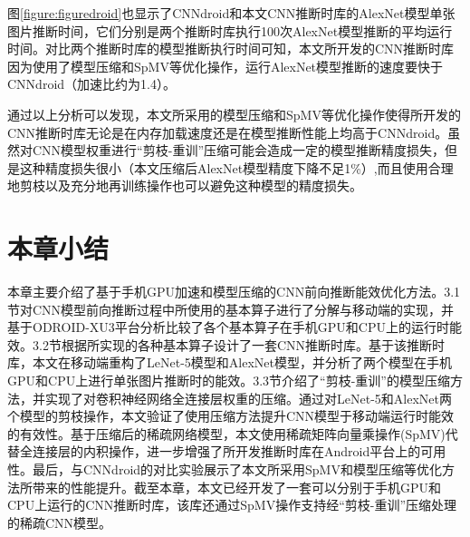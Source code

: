 图\ref{figure:figuredroid}也显示了CNNdroid和本文CNN推断时库的AlexNet模型单张图片推断时间，它们分别是两个推断时库执行100次AlexNet模型推断的平均运行时间。对比两个推断时库的模型推断执行时间可知，本文所开发的CNN推断时库因为使用了模型压缩和SpMV等优化操作，运行AlexNet模型推断的速度要快于CNNdroid（加速比约为1.4）。

通过以上分析可以发现，本文所采用的模型压缩和SpMV等优化操作使得所开发的CNN推断时库无论是在内存加载速度还是在模型推断性能上均高于CNNdroid。虽然对CNN模型权重进行“剪枝-重训”压缩可能会造成一定的模型推断精度损失，但是这种精度损失很小（本文压缩后AlexNet模型精度下降不足1\%）,而且使用合理地剪枝以及充分地再训练操作也可以避免这种模型的精度损失。



\section{本章小结}

本章主要介绍了基于手机GPU加速和模型压缩的CNN前向推断能效优化方法。3.1节对CNN模型前向推断过程中所使用的基本算子进行了分解与移动端的实现，并基于ODROID-XU3平台分析比较了各个基本算子在手机GPU和CPU上的运行时能效。3.2节根据所实现的各种基本算子设计了一套CNN推断时库。基于该推断时库，本文在移动端重构了LeNet-5模型和AlexNet模型，并分析了两个模型在手机GPU和CPU上进行单张图片推断时的能效。3.3节介绍了“剪枝-重训”的模型压缩方法，并实现了对卷积神经网络全连接层权重的压缩。通过对LeNet-5和AlexNet两个模型的剪枝操作，本文验证了使用压缩方法提升CNN模型于移动端运行时能效的有效性。基于压缩后的稀疏网络模型，本文使用稀疏矩阵向量乘操作(SpMV)代替全连接层的内积操作，进一步增强了所开发推断时库在Android平台上的可用性。最后，与CNNdroid的对比实验展示了本文所采用SpMV和模型压缩等优化方法所带来的性能提升。截至本章，本文已经开发了一套可以分别于手机GPU和CPU上运行的CNN推断时库，该库还通过SpMV操作支持经“剪枝-重训”压缩处理的稀疏CNN模型。

\cleardoublepage
